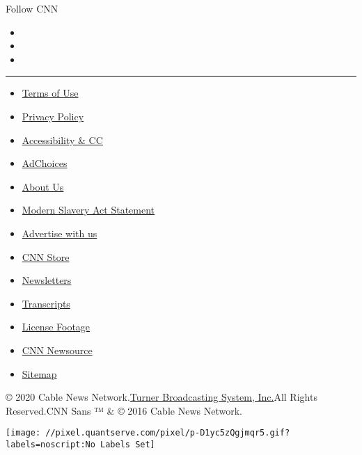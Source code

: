 Follow CNN

\begin{itemize}
\item
\item
\item
\end{itemize}

\begin{center}\rule{0.5\linewidth}{\linethickness}\end{center}

\begin{itemize}
\tightlist
\item
  \href{/terms}{Terms of Use}
\item
  \href{/privacy}{Privacy Policy}
\item
  \href{/accessibility}{Accessibility \& CC}
\item
  \protect\hyperlink{}{AdChoices}
\item
  \href{/about}{About Us}
\item
  \href{/msa}{Modern Slavery Act Statement}
\item
  \href{https://commercial.cnn.com}{Advertise with us}
\item
  \href{//store.cnn.com}{CNN Store}
\item
  \href{/newsletters}{Newsletters}
\item
  \href{/transcripts}{Transcripts}
\item
  \href{/collection}{License Footage}
\item
  \href{http://cnnnewsource.com}{CNN Newsource}
\item
  \href{https://www.cnn.com/sitemap.html}{Sitemap}
\end{itemize}

© 2020 Cable News Network.\href{//www.turner.com}{Turner Broadcasting
System, Inc.}All Rights Reserved.CNN Sans ™ \& © 2016 Cable News
Network.

\texttt{[image: //pixel.quantserve.com/pixel/p-D1yc5zQgjmqr5.gif?labels=noscript:No Labels Set]}
